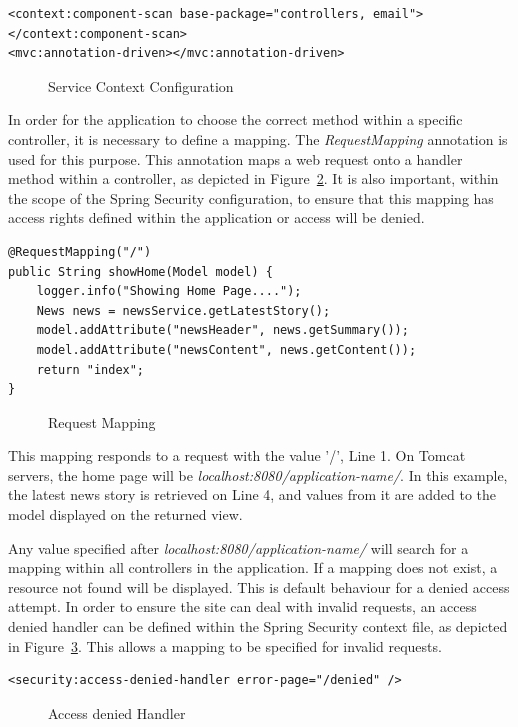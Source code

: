\begin{lstlisting}
<context:component-scan base-package="controllers, email"></context:component-scan>
<mvc:annotation-driven></mvc:annotation-driven>
\end{lstlisting}
\begin{figure}[H]
\caption{Service Context Configuration}
\label{fig:dscomponent}
\end{figure}

In order for the application to choose the correct method within a specific controller, it is necessary to define a mapping. The \textit{RequestMapping} annotation is used for this purpose. This annotation maps a web request onto a handler method within a controller, as depicted in Figure~\ref{fig:requestmapping}. It is also important, within the scope of the Spring Security configuration, to ensure that this mapping has access rights defined within the application or access will be denied.

\begin{lstlisting}
@RequestMapping("/")
public String showHome(Model model) {
	logger.info("Showing Home Page....");
	News news = newsService.getLatestStory();
	model.addAttribute("newsHeader", news.getSummary());
	model.addAttribute("newsContent", news.getContent());
	return "index";
}
\end{lstlisting}
\begin{figure}[H]
\caption{Request Mapping}
\label{fig:requestmapping}
\end{figure}

This mapping responds to a request with the value '/', Line 1. On Tomcat servers, the home page will be \textit{localhost:8080/application-name/}. In this example, the latest news story is retrieved on Line 4, and values from it are added to the model displayed on the returned view.

Any value specified after \textit{localhost:8080/application-name/} will search for a mapping within all controllers in the application. If a mapping does not exist, a resource not found will be displayed. This is default behaviour for a denied access attempt. In order to ensure the site can deal with invalid requests, an access denied handler can be defined within the Spring Security context file, as depicted in Figure~\ref{fig:accessDenied}. This allows a mapping to be specified for invalid requests.

\begin{lstlisting}
<security:access-denied-handler error-page="/denied" />
\end{lstlisting}
\begin{figure}[H]
\caption{Access denied Handler}
\label{fig:accessDenied}
\end{figure}

